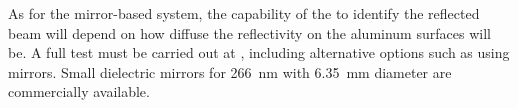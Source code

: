 As for the mirror-based system, the capability of the  to identify the reflected beam will depend on how diffuse the reflectivity on the aluminum surfaces will be. A full test must be carried out at , including alternative options such as using mirrors. Small dielectric mirrors for \SI{266}{\nano\m} with \SI{6.35}{\milli\m} diameter are commercially available.


